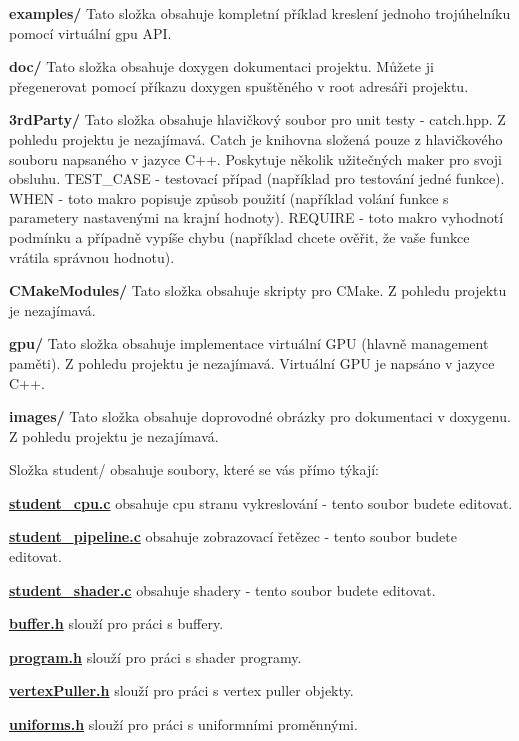 {\bfseries examples/} Tato složka obsahuje kompletní příklad kreslení jednoho trojúhelníku pomocí virtuální gpu A\-P\-I.

{\bfseries doc/} Tato složka obsahuje doxygen dokumentaci projektu. Můžete ji přegenerovat pomocí příkazu doxygen spuštěného v root adresáři projektu.

{\bfseries 3rd\-Party/} Tato složka obsahuje hlavičkový soubor pro unit testy -\/ catch.\-hpp. Z pohledu projektu je nezajímavá. Catch je knihovna složená pouze z hlavičkového souboru napsaného v jazyce C++. Poskytuje několik užitečných maker pro svoji obsluhu. T\-E\-S\-T\-\_\-\-C\-A\-S\-E -\/ testovací případ (například pro testování jedné funkce). W\-H\-E\-N -\/ toto makro popisuje způsob použití (například volání funkce s parametery nastavenými na krajní hodnoty). R\-E\-Q\-U\-I\-R\-E -\/ toto makro vyhodnotí podmínku a případně vypíše chybu (například chcete ověřit, že vaše funkce vrátila správnou hodnotu).

{\bfseries C\-Make\-Modules/} Tato složka obsahuje skripty pro C\-Make. Z pohledu projektu je nezajímavá.

{\bfseries gpu/} Tato složka obsahuje implementace virtuální G\-P\-U (hlavně management paměti). Z pohledu projektu je nezajímavá. Virtuální G\-P\-U je napsáno v jazyce C++.

{\bfseries images/} Tato složka obsahuje doprovodné obrázky pro dokumentaci v doxygenu. Z pohledu projektu je nezajímavá.

Složka student/ obsahuje soubory, které se vás přímo týkají\-:

{\bfseries \hyperlink{student__cpu_8c}{student\-\_\-cpu.\-c}} obsahuje cpu stranu vykreslování -\/ tento soubor budete editovat.

{\bfseries \hyperlink{student__pipeline_8c}{student\-\_\-pipeline.\-c}} obsahuje zobrazovací řetězec -\/ tento soubor budete editovat.

{\bfseries \hyperlink{student__shader_8c}{student\-\_\-shader.\-c}} obsahuje shadery -\/ tento soubor budete editovat.

{\bfseries \hyperlink{buffer_8h}{buffer.\-h}} slouží pro práci s buffery.

{\bfseries \hyperlink{program_8h}{program.\-h}} slouží pro práci s shader programy.

{\bfseries \hyperlink{vertexPuller_8h}{vertex\-Puller.\-h}} slouží pro práci s vertex puller objekty.

{\bfseries \hyperlink{uniforms_8h}{uniforms.\-h}} slouží pro práci s uniformními proměnnými.

